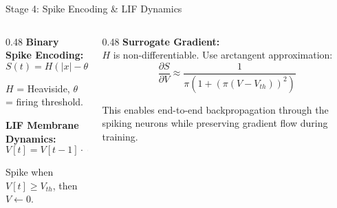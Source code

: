 \documentclass[10pt]{beamer}
\begin{document}
\begin{frame}{Stage 4: Spike Encoding \& LIF Dynamics}

\footnotesize
\begin{columns}[T]
\begin{column}{0.48\textwidth}
\textbf{Binary Spike Encoding:}
\vspace{-2pt}
\begin{equation}
S(t) = H(|x| - \theta)
\tag{Eq.~12}
\end{equation}

\vspace{-4pt}
$H$ = Heaviside, $\theta$ = firing threshold.

\vspace{2pt}
\textbf{LIF Membrane Dynamics:}
\vspace{-2pt}
\begin{equation}
V[t] = V[t\!-\!1] \cdot (1 - 1/\tau) + X[t]
\tag{Eq.~14}
\end{equation}

\vspace{-4pt}
Spike when $V[t] \geq V_{th}$, then $V \!\leftarrow\! 0$.
\end{column}
\begin{column}{0.48\textwidth}
\textbf{Surrogate Gradient:}\\
$H$ is non-differentiable. Use arctangent approximation:
\vspace{-2pt}
\begin{equation}
\frac{\partial S}{\partial V} \approx \frac{1}{\pi(1 + (\pi(V - V_{th}))^2)}
\tag{Eq.~13}
\end{equation}

\vspace{2pt}
This enables end-to-end backpropagation through the spiking neurons while preserving gradient flow during training.
\end{column}
\end{columns}

\end{frame}
\end{document}
